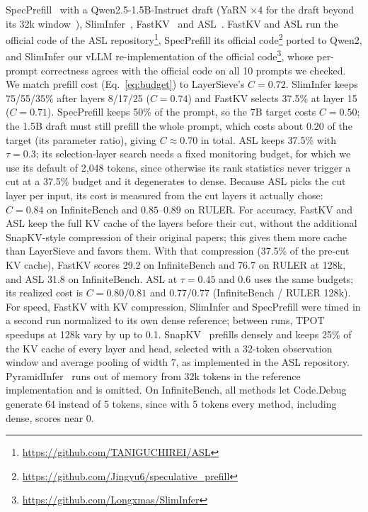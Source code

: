 \documentclass[10pt,conference]{IEEEtran}
\begin{document}
SpecPrefill~\cite{liu2025specprefill} with a Qwen2.5-1.5B-Instruct draft (YaRN $\times 4$ for the draft beyond its 32k window~\cite{peng2024yarn}), SlimInfer~\cite{long2026sliminfer}, FastKV~\cite{jo2026fastkv} and ASL~\cite{taniguchi2026asl}. FastKV and ASL run the official code of the ASL repository\footnote{\url{https://github.com/TANIGUCHIREI/ASL}}, SpecPrefill its official code\footnote{\url{https://github.com/Jingyu6/speculative_prefill}} ported to Qwen2, and SlimInfer our vLLM re-implementation of the official code\footnote{\url{https://github.com/Longxmas/SlimInfer}}, whose per-prompt correctness agrees with the official code on all 10 prompts we checked. We match prefill cost (Eq.~\eqref{eq:budget}) to LayerSieve's $C=0.72$. SlimInfer keeps 75/55/35\% after layers 8/17/25 ($C=0.74$) and FastKV selects 37.5\% at layer 15 ($C=0.71$). SpecPrefill keeps 50\% of the prompt, so the 7B target costs $C=0.50$; the 1.5B draft must still prefill the whole prompt, which costs about $0.20$ of the target (its parameter ratio), giving $C\approx0.70$ in total. ASL keeps 37.5\% with $\tau=0.3$; its selection-layer search needs a fixed monitoring budget, for which we use its default of 2{,}048 tokens, since otherwise its rank statistics never trigger a cut at a 37.5\% budget and it degenerates to dense. Because ASL picks the cut layer per input, its cost is measured from the cut layers it actually chose: $C=0.84$ on InfiniteBench and $0.85$--$0.89$ on RULER. For accuracy, FastKV and ASL keep the full KV cache of the layers before their cut, without the additional SnapKV-style compression of their original papers; this gives them more cache than LayerSieve and favors them. With that compression (37.5\% of the pre-cut KV cache), FastKV scores 29.2 on InfiniteBench and 76.7 on RULER at 128k, and ASL 31.8 on InfiniteBench. ASL at $\tau=0.45$ and $0.6$ uses the same budgets; its realized cost is $C=0.80/0.81$ and $0.77/0.77$ (InfiniteBench / RULER 128k). For speed, FastKV with KV compression, SlimInfer and SpecPrefill were timed in a second run normalized to its own dense reference; between runs, TPOT speedups at 128k vary by up to 0.1. SnapKV~\cite{li2024snapkv} prefills densely and keeps 25\% of the KV cache of every layer and head, selected with a 32-token observation window and average pooling of width 7, as implemented in the ASL repository. PyramidInfer~\cite{yang2024pyramidinfer} runs out of memory from 32k tokens in the reference implementation and is omitted. On InfiniteBench, all methods let Code.Debug generate 64 instead of 5 tokens, since with 5 tokens every method, including dense, scores near 0.
\end{document}
